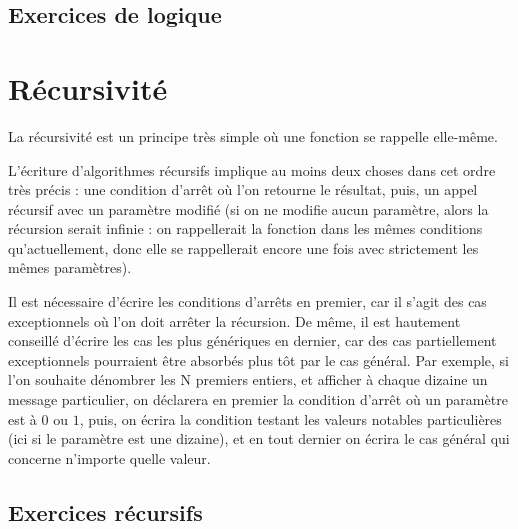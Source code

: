 \documentclass[11pt,a4paper]{article}
\begin{document}

\subsection{Exercices de logique}



\newpage


\section{Récursivité}

\bigskip

La récursivité est un principe très simple où une fonction se rappelle elle-même. %

\smallskip

L'écriture d'algorithmes récursifs implique au moins deux choses dans cet ordre très précis : une condition d'arrêt où l'on retourne le résultat, puis, un appel récursif avec un paramètre modifié (si on ne modifie aucun paramètre, alors la récursion serait infinie : on rappellerait la fonction dans les mêmes conditions qu'actuellement, donc elle se rappellerait encore une fois avec strictement les mêmes paramètres).

\smallskip

Il est nécessaire d'écrire les conditions d'arrêts en premier, car il s'agit des cas exceptionnels où l'on doit arrêter la récursion.
De même, il est hautement conseillé d'écrire les cas les plus génériques en dernier, car des cas partiellement exceptionnels pourraient être absorbés plus tôt par le cas général.
Par exemple, si l'on souhaite dénombrer les N premiers entiers, et afficher à chaque dizaine un message particulier, on déclarera en premier la condition d'arrêt où un paramètre est à $ 0 $ ou $ 1 $, puis, on écrira la condition testant les valeurs notables particulières (ici si le paramètre est une dizaine), et en tout dernier on écrira le cas général qui concerne n'importe quelle valeur.

\bigskip


\subsection{Exercices récursifs}
\end{document}
